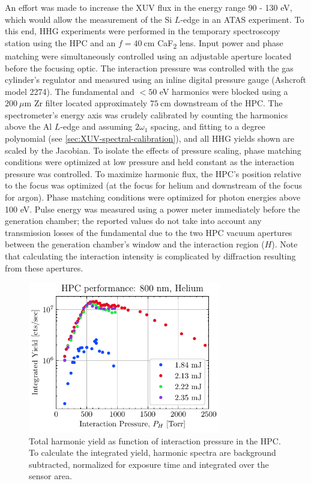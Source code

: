 An effort was made to increase the XUV flux in the energy range 90 - 130 eV, which would allow the measurement of the Si $L$-edge in an ATAS experiment. To this end, HHG experiments were performed in the temporary spectroscopy station using the HPC and an $f = 40 \ \textrm{cm}$ CaF\textsubscript{2} lens. Input power and phase matching were simultaneously controlled using an adjustable aperture located before the focusing optic. The interaction pressure was controlled with the gas cylinder's regulator and measured using an inline digital pressure gauge (Ashcroft model 2274). The fundamental and $<50$ eV harmonics were blocked using a $200 \ \mu\textrm{m}$ Zr filter located approximately $75 \ \textrm{cm}$ downstream of the HPC. The spectrometer's energy axis was crudely calibrated by counting the harmonics above the Al $L$-edge and assuming $2\omega_1$ spacing, and fitting to a  degree polynomial (see \cref{sec:XUV-spectral-calibration}), and all HHG yields shown are scaled by the Jacobian. To isolate the effects of pressure scaling, phase matching conditions were optimized at low pressure and held constant as the interaction pressure was controlled. To maximize harmonic flux, the HPC's position relative to the focus was optimized (at the focus for helium and downstream of the focus for argon). Phase matching conditions were optimized for photon energies above 100 eV. Pulse energy was measured using a power meter immediately before the generation chamber; the reported values do not take into account any transmission losses of the fundamental due to the two HPC vacuum apertures between the generation chamber's window and the interaction region ($H$). Note that calculating the interaction intensity is complicated by diffraction resulting from these apertures.

\begin{figure}
	\centering
	\includegraphics[width=0.75\textwidth]{figures/chap3/HPC_P_scaling_He800.pdf}
	\caption{Total harmonic yield as function of interaction pressure in the HPC. To calculate the integrated yield, harmonic spectra are background subtracted, normalized for exposure time and integrated over the sensor area.}
	\label{fig:HPC_P_scaling_He800}
\end{figure}

